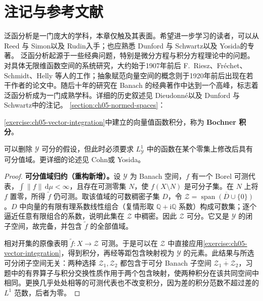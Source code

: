 \documentclass[../../main.tex]{subfiles}
\begin{document}
\section{注记与参考文献}\label{section:ch05-notes-references}\label{section:ch05-notes}
泛函分析是一门庞大的学科，本章仅触及其表面。希望进一步学习的读者，可以从 Reed 与 Simon\cite{folland-bib-112}以及 Rudin\cite{folland-bib-126}入手；也应熟悉 Dunford 与 Schwartz\cite{folland-bib-035}以及 Yosida\cite{folland-bib-163}的专著。
泛函分析起源于一些经典问题，特别是微分方程与积分方程理论中的问题。对具体无限维函数空间的系统研究，大约始于1907年前后 F.~Riesz、Fréchet、Schmidt、Helly 等人的工作；抽象赋范向量空间的概念则于1920年前后出现在若干作者的论文中。随后十年的研究在 Banach 的经典著作\cite{folland-bib-009}中达到一个高峰，标志着泛函分析成为一门成熟学科。详细的历史叙述见 Dieudonné\cite{folland-bib-033}以及 Dunford 与 Schwartz\cite{folland-bib-035}中的注记。
\cref{section:ch05-normed-spaces}：
\begin{definition}[Bochner 积分]\label{definition:ch05-bochner-integral}
\cref{exercise:ch05-vector-integration}中建立的向量值函数积分，称为 \textbf{Bochner 积分}。
\end{definition}
可以删除 $\mathscr Y$ 可分的假设，但此时必须要求 $L_{\mathscr Y}^1$ 中的函数在某个零集上修改后具有可分值域。更详细的论述见 Cohn\cite{folland-bib-027}或 Yosida\cite{folland-bib-163}。
\begin{proof}
\textbf{可分值域归约（重构新增）。}设 $\mathscr Y$ 为 Banach 空间，$f$ 有一个 Borel 可测代表，$\int\|f\|\,\mathrm d\mu<\infty$，且存在可测零集 $N$，使 $f(X\setminus N)$ 是可分子集。在 $N$ 上将 $f$ 置零，所得 $\widetilde f$ 仍可测。取该值域的可数稠密子集 $D$，令 $\mathscr Z=\overline{\operatorname{span}(D\cup\{0\})}$。$D$ 中向量的有限有理系数线性组合（复情形取 $\mathbb Q+\mathrm i\mathbb Q$ 系数）构成可数集；逐个逼近任意有限组合的系数，说明此集在 $\mathscr Z$ 中稠密。因此 $\mathscr Z$ 可分。它又是 $\mathscr Y$ 的闭子空间，故完备，并包含 $\widetilde f$ 的全部值域。

相对开集的原像表明 $\widetilde f:X\to\mathscr Z$ 可测。于是可以在 $\mathscr Z$ 中直接应用\cref{exercise:ch05-vector-integration}，得到积分，再经等距包含映射视为 $\mathscr Y$ 的元素。此结果与所选可分闭子空间无关：两种选择 $\mathscr Z_1,\mathscr Z_2$ 都包含于可分 Banach 子空间 $\overline{\mathscr Z_1+\mathscr Z_2}$，习题中的有界算子与积分交换性质作用于两个包含映射，使两种积分在该共同空间中相同。更换几乎处处相等的可测代表也不改变积分，因为差的积分范数不超过差的 $L^1$ 范数，后者为零。
\end{proof}
\end{document}
